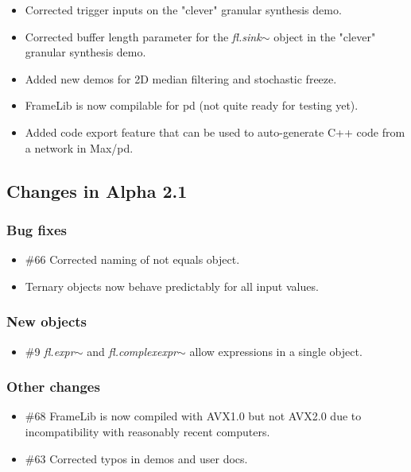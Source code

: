 \documentclass{article}
\newcommand{\flobject}[1]{\textit{fl.#1$\sim$}}
\begin{document}
\begin{itemize}
\item Corrected trigger inputs on the "clever" granular synthesis demo.
\item Corrected buffer length parameter for the  \flobject{sink} object in the "clever" granular synthesis demo.
\item Added new demos for 2D median filtering and stochastic freeze.
\item FrameLib is now compilable for pd (not quite ready for testing yet).
\item Added code export feature that can be used to auto-generate C++ code from a network in Max/pd.
\end{itemize}


\subsection{Changes in Alpha 2.1}
\vspace{0.1in}

\subsubsection{Bug fixes}

\begin{itemize}
\item {\#66} Corrected naming of not equals object.
\item Ternary objects now behave predictably for all input values.
\end{itemize}

\subsubsection{New objects}

\begin{itemize}
\item {\#9} \flobject{expr} and \flobject{complexexpr} allow expressions in a single object.
\end{itemize}

\subsubsection{Other changes}

\begin{itemize}
\item {\#68} FrameLib is now compiled with AVX1.0 but not AVX2.0 due to incompatibility with reasonably recent computers.
\item {\#63} Corrected typos in demos and user docs.
\end{itemize}
\end{document}
